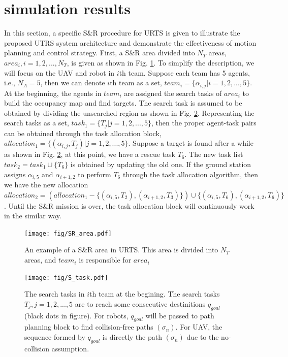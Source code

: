 \documentclass{ieeeaccess}
\begin{document}
\section{simulation results}
In this section, a specific S\&R procedure for URTS is given to illustrate the proposed UTRS system architecture and demonstrate the effectiveness of motion planning and control strategy. First, a S\&R area divided into $N_T$ areas, $area_i,i=1,2,...,N_T$, is given as shown in Fig. \ref{fig:SR_area}. To simplify the description, we will focus on the UAV and robot in $i$th team. Suppose each team has 5 agents, i.e., $N_A=5$, then we can denote $i$th team as a set, $team_i=\{ \alpha_{i,j} | i=1,2,...,5 \}$. At the beginning, the agents in $team_i$ are assigned the search tasks of $area_i$ to build the occupancy map and find targets. The search task is assumed to be obtained by dividing the unsearched region as shown in Fig. \ref{fig:S_task}. Representing the search tasks as a set, $task_1=\{ T_j | j=1,2,...,5 \}$, then the proper agent-task pairs can be obtained through the task allocation block, $allocation_1=\{ (\alpha_{i,j},T_j) | j=1,2,...,5 \}$. Suppose a target is found after a while as shown in Fig. \ref{fig:S_task}, at this point, we have a rescue task $T_6$. The new task list $task_2=task_1\cup\{ T_6 \}$ is obtained by updating the old one. If the ground station assigns $\alpha_{i,5}$ and $\alpha_{i+1,2}$ to perform $T_6$ through the task allocation algorithm, then we have the new allocation $allocation_2=(allocation_1-\{ (\alpha_{i,5},T_2),(\alpha_{i+1,2},T_3) \})\cup\{ (\alpha_{i,5},T_6),(\alpha_{i+1,2},T_6) \}$. Until the S\&R mission is over, the task allocation block will continuously work in the similar way.
\begin{figure}[htbp]
    \centering
    \texttt{[image: fig/SR\_area.pdf]}\caption{An example of a S\&R area in URTS. This area is divided into $N_T$ areas, and $team_i$ is responsible for $area_i$}%
    \label{fig:SR_area}
\end{figure}
\begin{figure}[htbp]
    \centering
    \texttt{[image: fig/S\_task.pdf]}\caption{The search tasks in $i$th team at the begining. The search tasks $T_j,j=1,2,...,5$ are to reach some consecutive destinitions $q_{goal}$ (black dots in figure). For robots, $q_{goal}$ will be passed to path planning block to find collision-free paths $(\sigma_n)$. For UAV, the sequence formed by $q_{goal}$ is directly the path $(\sigma_n)$ due to the no-collision assumption.}
    \label{fig:S_task}
\end{figure}
\end{document}
